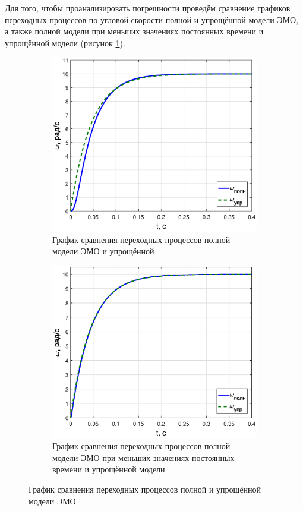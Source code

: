 \documentclass[12pt,a4paper]{article}
\begin{document}
Для того, чтобы проанализировать погрешности проведём сравнение графиков переходных процессов по угловой скорости полной и упрощённой модели ЭМО, а также полной модели при меньших значениях постоянных времени и упрощённой модели (рисунок \ref{sravnenie}). 
\begin{figure}[H]
	\centering
	\begin{subfigure}[b]{0.48\textwidth}
	    \includegraphics[width = \textwidth]{wsravnenie1}
		\caption{График сравнения переходных процессов полной модели ЭМО и упрощённой}
	\end{subfigure}
	\hfill
	\begin{subfigure}[b]{0.48\textwidth}
		\includegraphics[width = \textwidth]{wsravnenie2}
		\caption{График сравнения переходных процессов полной модели ЭМО при меньших значениях постоянных времени и упрощённой модели}
	\end{subfigure}
	\caption{График сравнения переходных процессов полной и упрощённой модели ЭМО}
	\label{sravnenie}
\end{figure}
\end{document}
